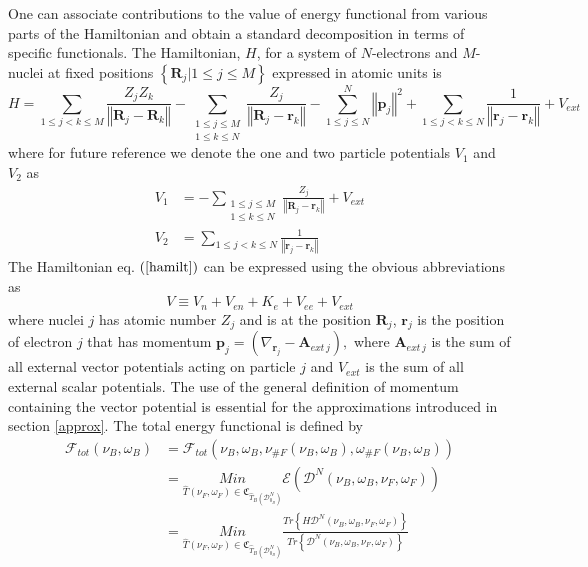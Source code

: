 \documentclass[aps,preprint]{revtex4}%
\begin{document}
One can associate contributions to the value of energy functional from various
parts of the Hamiltonian and obtain a standard decomposition in terms of
specific functionals. The Hamiltonian, $H$, for a system of $N$-electrons and
$M$-nuclei at fixed positions $\left\{  \mathbf{R}_{j}|1\leq j\leq M\right\}
$ expressed in atomic units is
\begin{equation}
H=\sum_{1\leq j<k\leq M}\frac{Z_{j}Z_{k}}{\left\Vert \mathbf{R}_{j}%
-\mathbf{R}_{k}\right\Vert }-\sum_{\substack{1\leq j\leq M\\1\leq k\leq
N}}\frac{Z_{j}}{\left\Vert \mathbf{R}_{j}-\mathbf{r}_{k}\right\Vert }%
-\sum_{1\leq j\leq N}^{N}\left\Vert \mathbf{p}_{j}\right\Vert ^{2}+\sum_{1\leq
j<k\leq N}\frac{1}{\left\Vert \mathbf{r}_{j}-\mathbf{r}_{k}\right\Vert
}+V_{ext} \label{hamilt}%
\end{equation}
where for future reference we denote the one and two particle potentials
$V_{1}$ and $V_{2}$ as
\begin{align}
V_{1}  &  =-\sum_{\substack{1\leq j\leq M\\1\leq k\leq N}}\frac{Z_{j}%
}{\left\Vert \mathbf{R}_{j}-\mathbf{r}_{k}\right\Vert }+V_{ext}\nonumber\\
V_{2}  &  =\sum_{1\leq j<k\leq N}\frac{1}{\left\Vert \mathbf{r}_{j}%
-\mathbf{r}_{k}\right\Vert }%
\end{align}
The Hamiltonian eq. $\left(  \ref{hamilt}\right)  $ can be expressed using the
obvious abbreviations as
\begin{equation}
V\equiv V_{n}+V_{en}+K_{e}+V_{ee}+V_{ext}%
\end{equation}
where nuclei $j$ has atomic number $Z_{j}$ and is at the position
$\mathbf{R}_{j}$, $\mathbf{r}_{j}$ is the position of electron $j$ that has
momentum $\mathbf{p}_{j}=\left(  \nabla_{\mathbf{r}_{j}}-\mathbf{A}%
_{ext\,j}\right)  ,$ where $\mathbf{A}_{ext\,j}$ is the sum of all external
vector potentials acting on particle $j$ and $V_{ext}$ is the sum of all
external scalar potentials. The use of the general definition of momentum
containing the vector potential is essential for the approximations introduced
in section \ref{approx}. The total energy functional is defined by
\begin{align}
\mathcal{F}_{tot}\left(  \nu_{B},\omega_{B}\right)   &  =\mathcal{F}%
_{tot}\left(  \nu_{B},\omega_{B},\nu_{\#F}\left(  \nu_{B},\omega_{B}\right)
,\omega_{\#F}\left(  \nu_{B},\omega_{B}\right)  \right) \nonumber\\
&  =\underset{\hat{T}\left(  \nu_{F},\omega_{F}\right)  \in\mathfrak{C}%
_{\hat{T}_{B}\left(  \mathcal{D}_{0_{B}}^{N}\right)  }}{Min}\mathcal{E}\left(
\mathcal{D}^{N}\left(  \nu_{B},\omega_{B},\nu_{F},\omega_{F}\right)  \right)
\nonumber\\
&  =\underset{\hat{T}\left(  \nu_{F},\omega_{F}\right)  \in\mathfrak{C}%
_{\hat{T}_{B}\left(  \mathcal{D}_{0_{B}}^{N}\right)  }}{Min}\frac{Tr\left\{
H\mathcal{D}^{N}\left(  \nu_{B},\omega_{B},\nu_{F},\omega_{F}\right)
\right\}  }{Tr\left\{  \mathcal{D}^{N}\left(  \nu_{B},\omega_{B},\nu
_{F},\omega_{F}\right)  \right\}  }%
\end{align}
\end{document}
